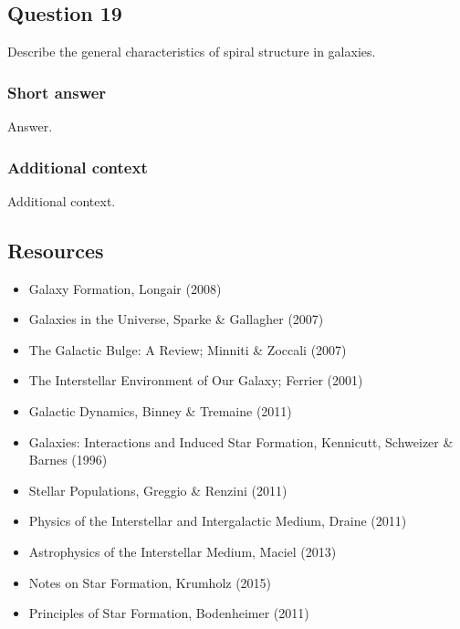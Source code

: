 \documentclass[a4paper,10pt]{article}
\begin{document}

\newpage
\subsection{Question 19}

Describe the general characteristics of spiral structure in galaxies.

\subsubsection{Short answer}

Answer.

\subsubsection{Additional context}

Additional context.


\newpage
\subsection{Resources}

\begin{itemize}
    \item Galaxy Formation, Longair (2008)
    \item Galaxies in the Universe, Sparke \& Gallagher (2007)
    \item The Galactic Bulge: A Review; Minniti \& Zoccali (2007)
    \item The Interstellar Environment of Our Galaxy; Ferrier (2001)
    \item Galactic Dynamics, Binney \& Tremaine (2011)
    \item Galaxies: Interactions and Induced Star Formation, Kennicutt, Schweizer \& Barnes (1996)
    \item Stellar Populations, Greggio \& Renzini (2011)
    \item Physics of the Interstellar and Intergalactic Medium, Draine (2011)
    \item Astrophysics of the Interstellar Medium, Maciel (2013)
    \item Notes on Star Formation, Krumholz (2015)
    \item Principles of Star Formation, Bodenheimer (2011)
\end{itemize}
\end{document}
